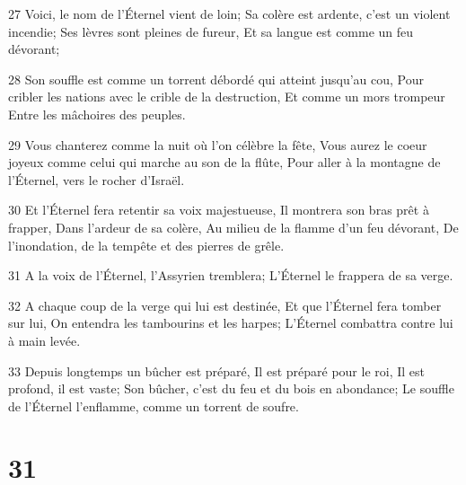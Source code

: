 \par 27 Voici, le nom de l'Éternel vient de loin; Sa colère est ardente, c'est un violent incendie; Ses lèvres sont pleines de fureur, Et sa langue est comme un feu dévorant;
\par 28 Son souffle est comme un torrent débordé qui atteint jusqu'au cou, Pour cribler les nations avec le crible de la destruction, Et comme un mors trompeur Entre les mâchoires des peuples.
\par 29 Vous chanterez comme la nuit où l'on célèbre la fête, Vous aurez le coeur joyeux comme celui qui marche au son de la flûte, Pour aller à la montagne de l'Éternel, vers le rocher d'Israël.
\par 30 Et l'Éternel fera retentir sa voix majestueuse, Il montrera son bras prêt à frapper, Dans l'ardeur de sa colère, Au milieu de la flamme d'un feu dévorant, De l'inondation, de la tempête et des pierres de grêle.
\par 31 A la voix de l'Éternel, l'Assyrien tremblera; L'Éternel le frappera de sa verge.
\par 32 A chaque coup de la verge qui lui est destinée, Et que l'Éternel fera tomber sur lui, On entendra les tambourins et les harpes; L'Éternel combattra contre lui à main levée.
\par 33 Depuis longtemps un bûcher est préparé, Il est préparé pour le roi, Il est profond, il est vaste; Son bûcher, c'est du feu et du bois en abondance; Le souffle de l'Éternel l'enflamme, comme un torrent de soufre.

\chapter{31}

